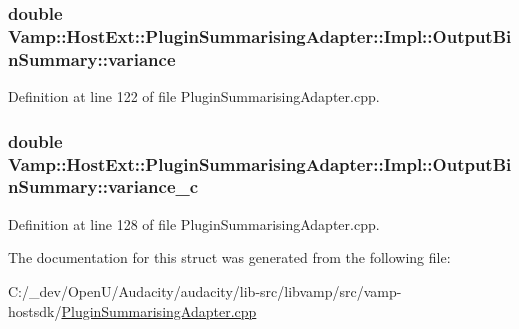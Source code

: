 \subsubsection[{\texorpdfstring{variance}{variance}}]{\setlength{\rightskip}{0pt plus 5cm}double Vamp\+::\+Host\+Ext\+::\+Plugin\+Summarising\+Adapter\+::\+Impl\+::\+Output\+Bin\+Summary\+::variance}\hypertarget{struct_vamp_1_1_host_ext_1_1_plugin_summarising_adapter_1_1_impl_1_1_output_bin_summary_ae97167eec30b7f6d5c5ff7cae7d99466}{}\label{struct_vamp_1_1_host_ext_1_1_plugin_summarising_adapter_1_1_impl_1_1_output_bin_summary_ae97167eec30b7f6d5c5ff7cae7d99466}


Definition at line 122 of file Plugin\+Summarising\+Adapter.\+cpp.

\subsubsection[{\texorpdfstring{variance\+\_\+c}{variance_c}}]{\setlength{\rightskip}{0pt plus 5cm}double Vamp\+::\+Host\+Ext\+::\+Plugin\+Summarising\+Adapter\+::\+Impl\+::\+Output\+Bin\+Summary\+::variance\+\_\+c}\hypertarget{struct_vamp_1_1_host_ext_1_1_plugin_summarising_adapter_1_1_impl_1_1_output_bin_summary_a16395b96ff1922e9d347bc52460e2401}{}\label{struct_vamp_1_1_host_ext_1_1_plugin_summarising_adapter_1_1_impl_1_1_output_bin_summary_a16395b96ff1922e9d347bc52460e2401}


Definition at line 128 of file Plugin\+Summarising\+Adapter.\+cpp.



The documentation for this struct was generated from the following file\+:\begin{DoxyCompactItemize}
\item 
C\+:/\+\_\+dev/\+Open\+U/\+Audacity/audacity/lib-\/src/libvamp/src/vamp-\/hostsdk/\hyperlink{_plugin_summarising_adapter_8cpp}{Plugin\+Summarising\+Adapter.\+cpp}\end{DoxyCompactItemize}
